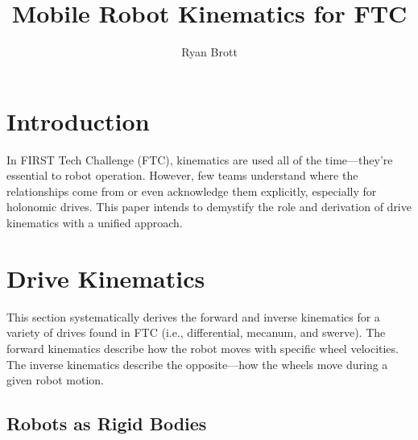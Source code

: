 \documentclass{article}
\title{Mobile Robot Kinematics for FTC}
\author{Ryan Brott}
\date{}
\begin{document}
\maketitle

\section{Introduction}

In FIRST Tech Challenge (FTC), kinematics are used all of the time---they're essential to robot operation. However, few teams  understand where the relationships come from or even acknowledge them explicitly, especially for holonomic drives. This paper intends to demystify the role and derivation of drive kinematics with a unified approach.

\section{Drive Kinematics}

This section systematically derives the forward and inverse kinematics for a variety of drives found in FTC (i.e., differential, mecanum, and swerve). The forward kinematics describe how the robot moves with specific wheel velocities. The inverse kinematics describe the opposite---how the wheels move during a given robot motion. 

\subsection{Robots as Rigid Bodies}
\end{document}
